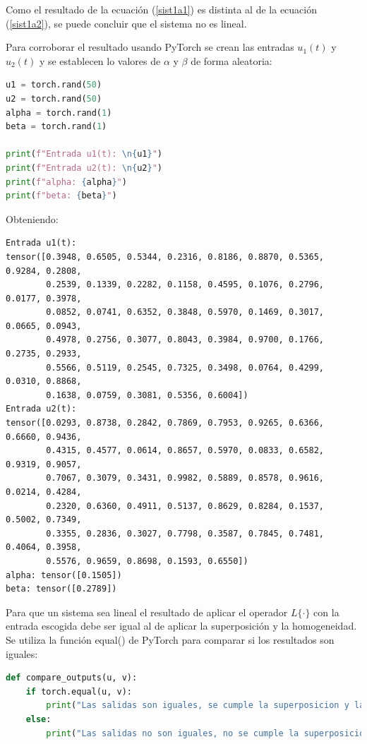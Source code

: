 \documentclass[12 pt]{article}
\begin{document}
\begin{enumerate}
Como el resultado de la ecuación (\ref{sist1a1}) es distinta al de la ecuación (\ref{sist1a2}), se puede concluir que el sistema no es lineal.

Para corroborar el resultado usando PyTorch se crean las entradas ${u_{1}(t)}$ y ${u_{2}(t)}$ y se establecen lo valores de ${\alpha}$ y ${\beta}$ de forma aleatoria:

\begin{lstlisting}[language=Python]
u1 = torch.rand(50)
u2 = torch.rand(50) 
alpha = torch.rand(1)
beta = torch.rand(1)

print(f"Entrada u1(t): \n{u1}")
print(f"Entrada u2(t): \n{u2}")
print(f"alpha: {alpha}")
print(f"beta: {beta}")
\end{lstlisting}

Obteniendo: 

\begin{lstlisting}
Entrada u1(t): 
tensor([0.3948, 0.6505, 0.5344, 0.2316, 0.8186, 0.8870, 0.5365, 0.9284, 0.2808,
        0.2539, 0.1339, 0.2282, 0.1158, 0.4595, 0.1076, 0.2796, 0.0177, 0.3978,
        0.0852, 0.0741, 0.6352, 0.3848, 0.5970, 0.1469, 0.3017, 0.0665, 0.0943,
        0.4978, 0.2756, 0.3077, 0.8043, 0.3984, 0.9700, 0.1766, 0.2735, 0.2933,
        0.5566, 0.5119, 0.2545, 0.7325, 0.3498, 0.0764, 0.4299, 0.0310, 0.8868,
        0.1638, 0.0759, 0.3081, 0.5356, 0.6004])
Entrada u2(t): 
tensor([0.0293, 0.8738, 0.2842, 0.7869, 0.7953, 0.9265, 0.6366, 0.6660, 0.9436,
        0.4315, 0.4577, 0.0614, 0.8657, 0.5970, 0.0833, 0.6582, 0.9319, 0.9057,
        0.7067, 0.3079, 0.3431, 0.9982, 0.5889, 0.8578, 0.9616, 0.0214, 0.4284,
        0.2320, 0.6360, 0.4911, 0.5137, 0.8629, 0.8284, 0.1537, 0.5002, 0.7349,
        0.3355, 0.2836, 0.3027, 0.7798, 0.3587, 0.7845, 0.7481, 0.4064, 0.3958,
        0.5576, 0.9659, 0.8698, 0.1593, 0.6550])
alpha: tensor([0.1505])
beta: tensor([0.2789])
\end{lstlisting}

Para que un sistema sea lineal el resultado de aplicar el operador ${L\{ \cdot \}}$ con la entrada escogida debe ser igual al de aplicar la superposición y la homogeneidad. Se utiliza la función equal() de PyTorch para comparar si los resultados son iguales:

\hspace{1mm}

\begin{lstlisting}[language=Python]
def compare_outputs(u, v):
    if torch.equal(u, v):
        print("Las salidas son iguales, se cumple la superposicion y la homogeneidad")
    else:
        print("Las salidas no son iguales, no se cumple la superposicion y la homogeneidad")
\end{lstlisting}


\end{enumerate}
\end{document}
